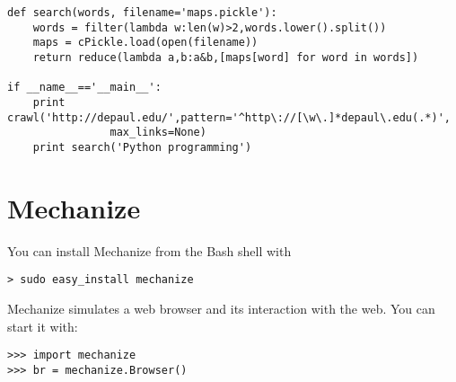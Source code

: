 \documentclass[justified,sixbynine]{tufte-book}
\theoremstyle{plain}%
\theoremstyle{definition}
\theoremstyle{remark}
\begin{document}
\begin{fullwidth}
\begin{lstlisting}
def search(words, filename='maps.pickle'):
    words = filter(lambda w:len(w)>2,words.lower().split())
    maps = cPickle.load(open(filename))
    return reduce(lambda a,b:a&b,[maps[word] for word in words])

if __name__=='__main__':
    print crawl('http://depaul.edu/',pattern='^http\://[\w\.]*depaul\.edu(.*)',
                max_links=None)
    print search('Python programming')

\end{lstlisting}


\goodbreak\chapter{Mechanize}

You can install Mechanize from the Bash shell with
\begin{lstlisting}
> sudo easy_install mechanize
\end{lstlisting}

Mechanize simulates a web browser and its interaction with the web. You can start it with:
\begin{lstlisting}
>>> import mechanize
>>> br = mechanize.Browser()
\end{lstlisting}


\end{fullwidth}
\end{document}
